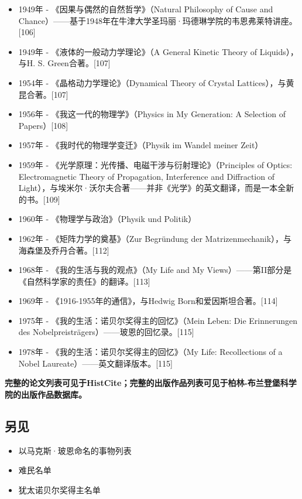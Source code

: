 \begin{itemize}
\item 1949年 - 《因果与偶然的自然哲学》（Natural Philosophy of Cause and Chance）——基于1948年在牛津大学圣玛丽·玛德琳学院的韦恩弗莱特讲座。[106]  
\item 1949年 - 《液体的一般动力学理论》（A General Kinetic Theory of Liquids），与H. S. Green合著。[107]  
\item 1954年 - 《晶格动力学理论》（Dynamical Theory of Crystal Lattices），与黄昆合著。[107]  
\item 1956年 - 《我这一代的物理学》（Physics in My Generation: A Selection of Papers）[108]  
\item 1957年 - 《我时代的物理学变迁》（Physik im Wandel meiner Zeit）  
\item 1959年 - 《光学原理：光传播、电磁干涉与衍射理论》（Principles of Optics: Electromagnetic Theory of Propagation, Interference and Diffraction of Light），与埃米尔·沃尔夫合著——并非《光学》的英文翻译，而是一本全新的书。[109]  
\item 1960年 - 《物理学与政治》（Physik und Politik）  
\item 1962年 - 《矩阵力学的奠基》（Zur Begründung der Matrizenmechanik），与海森堡及乔丹合著。[112]  
\item 1968年 - 《我的生活与我的观点》（My Life and My Views）——第II部分是《自然科学家的责任》的翻译。[113]  
\item 1969年 - 《1916-1955年的通信》，与Hedwig Born和爱因斯坦合著。[114]  
\item 1975年 - 《我的生活：诺贝尔奖得主的回忆》（Mein Leben: Die Erinnerungen des Nobelpreisträgers）——玻恩的回忆录。[115]  
\item 1978年 - 《我的生活：诺贝尔奖得主的回忆》（My Life: Recollections of a Nobel Laureate）——英文翻译版本。[115] 
\end{itemize} 

\textbf{完整的论文列表可见于HistCite；完整的出版作品列表可见于柏林-布兰登堡科学院的出版作品数据库。}
\subsection{另见}  
\begin{itemize}
\item 以马克斯·玻恩命名的事物列表  
\item 难民名单  
\item 犹太诺贝尔奖得主名单  
\end{itemize}